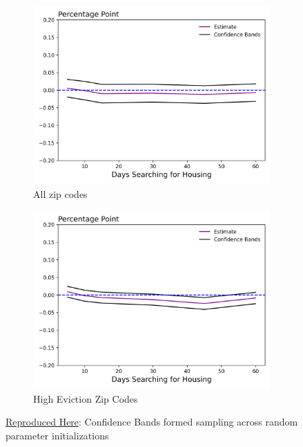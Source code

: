 \documentclass[a4paper,12pt]{article}
\begin{document}
\begin{figure}[htbp]
\centering
\begin{subfigure}{.48\textwidth}
    \centering
    \includegraphics[width=.95\linewidth]{figures/rtc/results/cceh/rfp_False_False_0.png}
    \caption{All zip codes}
    \label{SUBFIGURE LABEL 3}
\end{subfigure}
\begin{subfigure}{.48\textwidth}
    \centering
    \includegraphics[width=.95\linewidth]{figures/rtc/results/cceh/rfp_True_False_0.png}
    \caption{High Eviction Zip Codes}
    \label{SUBFIGURE LABEL 4}
\end{subfigure}
\caption{ \href{https://github.com/pharringtonp19/evictions/blob/main/scripts/cceh/primary/cluster_diff_n_diff.py}{Reproduced Here}: Confidence Bands formed sampling across random parameter initializations}
\label{fig:rfp_results}
\end{figure}
\end{document}
